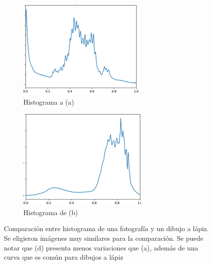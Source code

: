 \documentclass[letterpaper, 10 pt, conference]{ieeeconf}  %
\begin{document}
\begin{figure}
    \begin{subfigure}{0.45\linewidth}
\includegraphics[width=\linewidth,scale=1.2]{images/torre_f_hist.png}
    \caption{Histograma a (a)}
\label{fig:1a}
    \end{subfigure}\hfill
    \begin{subfigure}{0.45\linewidth}
\includegraphics[width=\linewidth,scale=1.2]{images/torre_d_hist.png}
    \caption{Histograma de (b)}
\label{fig:1a}
    \end{subfigure}
\caption{Comparación entre histograma de una fotografía y un dibujo a lápiz. Se eligieron imágenes muy similares para la comparación. Se puede notar que (d) presenta menos variaciones que (a), además de una curva que es común para dibujos a lápiz}
    \label{comp-hist}
    \end{figure}
\end{document}
